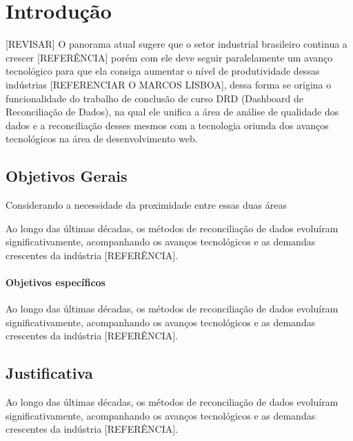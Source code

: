 \chapter[Introdução]{Introdução}

[REVISAR]
O panorama atual sugere que o setor industrial brasileiro continua a crescer [REFERÊNCIA] porém com ele deve seguir paralelamente um avanço tecnológico para que ela consiga aumentar o nível de produtividade dessas indústrias [REFERENCIAR O MARCOS LISBOA], dessa forma se origina o funcionalidade do trabalho de conclusão de curso DRD (Dashboard de Reconciliação de Dados), na qual ele unifica a área de análise de qualidade dos dados e a reconciliação desses mesmos com a tecnologia oriunda dos avanços tecnológicos na área de desenvolvimento web.

\section{Objetivos Gerais}

Considerando a necessidade da proximidade entre essas duas áreas

Ao longo das últimas décadas, os métodos de reconciliação de dados evoluíram significativamente, acompanhando os avanços tecnológicos e as demandas crescentes da indústria [REFERÊNCIA].

\subsubsection{Objetivos específicos}

Ao longo das últimas décadas, os métodos de reconciliação de dados evoluíram significativamente, acompanhando os avanços tecnológicos e as demandas crescentes da indústria [REFERÊNCIA].

\section{Justificativa}

Ao longo das últimas décadas, os métodos de reconciliação de dados evoluíram significativamente, acompanhando os avanços tecnológicos e as demandas crescentes da indústria [REFERÊNCIA].

